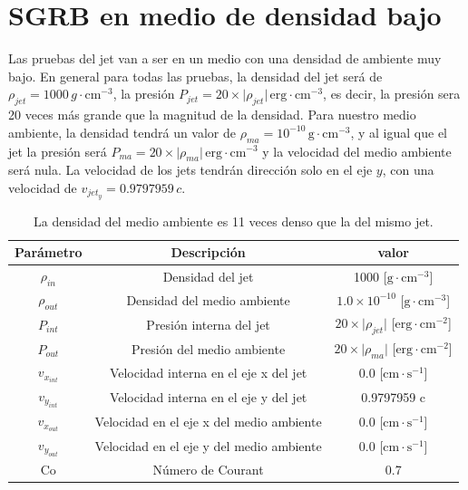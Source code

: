 \documentclass[12pt,a4paper]{book}
\begin{document}
\section{SGRB en medio de densidad bajo}\label{sec:SGRB_en_medio_de_densidad_bajo}


Las pruebas del jet van a ser en un medio con una densidad de ambiente muy bajo. En general para todas las pruebas, la densidad del jet será de $\rho_{jet}  = 1000 \, g \cdot \mathrm{cm}^{-3}$, la presión $P_{jet} = 20 \times  \lvert \rho_{jet} \rvert \, \mathrm{erg} \cdot \mathrm{cm}^{-3}$, es decir, la presión sera 20 veces más grande que la magnitud de la densidad. Para nuestro medio ambiente, la densidad tendrá un valor de $\rho_{ma}  = 10^{-10} \, \mathrm{g} \cdot \mathrm{cm}^{-3}$, y al igual que el jet la presión será $P_{ma} = 20 \times \lvert \rho_{ma} \rvert \, \mathrm{erg} \cdot \mathrm{cm}^{-3}$ y la velocidad del medio ambiente será nula. La velocidad de los jets tendrán dirección solo en el eje $y$, con una velocidad de $v_{jet_{y}} = 0.9797959 \, c$.

\begin{table}[htbp]
\begin{center}
\begin{tabular}{|c|c|c|}
\hline 
\textbf{Parámetro} & \textbf{Descripción} & \textbf{valor} \\ 
\hline 
$\rho_{in}$ &  Densidad del jet & 1000 [$\mathrm{g} \cdot \mathrm{cm}^{-3}$] \\ 
\hline 
$\rho_{out}$ &  Densidad del medio ambiente & $1.0 \times 10^{-10}$  [$\mathrm{g} \cdot \mathrm{cm}^{-3}$] \\
\hline 
$P_{int}$ & Presión interna del jet& $20 \times \lvert \rho_{jet} \lvert$ [$ \mathrm{erg}\cdot \mathrm{cm}^{-2}$]\\ 
\hline 
$P_{out}$ &  Presión del medio ambiente & $20 \times \lvert \rho_{ma} \lvert$ [$\mathrm{erg}\cdot \mathrm{cm}^{-2}$] \\ 
\hline 
$v_{x_{int}}$ & Velocidad interna en el eje x del jet & 0.0 [$\mathrm{cm}\cdot \mathrm{s}^{-1}$]\\ 
\hline 
$v_{y_{int}}$ & Velocidad interna en el eje y del jet & 0.9797959 c \\ 
\hline 
$v_{x_{out}}$ & Velocidad en el eje x del medio ambiente & 0.0 [$\mathrm{cm}\cdot \mathrm{s}^{-1}$] \\
\hline 
$v_{y_{out}}$ & Velocidad en el eje y del medio ambiente & 0.0 [$\mathrm{cm}\cdot \mathrm{s}^{-1}$]\\ 
\hline 
Co & Número de Courant & 0.7 \\ 
\hline 
\end{tabular}
\caption{\label{Cuadro: propiedades-jet-densidad-baja} La densidad del medio ambiente es 11 veces denso que la del mismo jet.}
\end{center}
\end{table}
\end{document}

